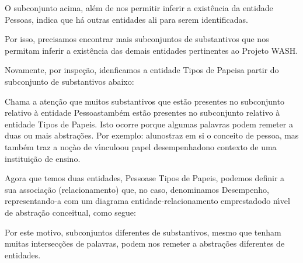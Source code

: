 \documentclass[
12pt,		%
openright,	%
twoside,  %
a4paper,			%
chapter=TITLE,		%
english,			%
french,				%
spanish,			%
brazil				%
]{USPSC-classe/USPSC}
\begin{document}
O subconjunto acima, al\'em de nos permitir inferir a exist\^encia da entidade \textquotedbl Pessoas\textquotedbl , indica que h\'a outras entidades ali para serem identificadas.


Por isso, precisamos encontrar mais subconjuntos de substantivos que nos permitam inferir a exist\^encia  das demais entidades pertinentes ao Projeto WASH.


Novamente, por inspe\c{c}\~ao, idenficamos a entidade \textquotedbl Tipos de Papeis\textquotedbl  a partir do subconjunto de substantivos abaixo:



\noindent\begin{center}\mbox{\centering{}}\end{center}


Chama a aten\c{c}\~ao que muitos substantivos que est\~ao presentes no subconjunto relativo \`a entidade \textquotedbl Pessoas\textquotedbl  tamb\'em est\~ao presentes no subconjunto relativo \`a entidade \textquotedbl Tipos de Papeis\textquotedbl . Isto ocorre porque algumas palavras podem remeter a duas ou mais abstra\c{c}\~oes. Por exemplo: \textquotedbl alunos\textquotedbl  traz em si o conceito de \textquotedbl pessoa\textquotedbl , mas tamb\'em traz a no\c{c}\`ao de \textquotedbl v\'{\i}nculo\textquotedbl  ou \textquotedbl papel desempenhado\textquotedbl  no contexto de uma institui\c{c}\~ao de ensino.


Agora que temos duas entidades, \textquotedbl Pessoas\textquotedbl  e \textquotedbl Tipos de Papeis\textquotedbl , podemos definir a sua associa\c{c}\~ao (relacionamento) que, no caso, denominamos \textquotedbl Desempenho\textquotedbl , representando-a com um diagrama entidade-relacionamento \textquotedbl emprestado\textquotedbl  do n\'{\i}vel de abstra\c{c}\~ao conceitual, como segue:


Por este motivo, subconjuntos diferentes de substantivos, mesmo que tenham muitas intersec\c{c}\~oes de palavras, podem nos remeter a abstra\c{c}\~oes diferentes de entidades.
\end{document}
